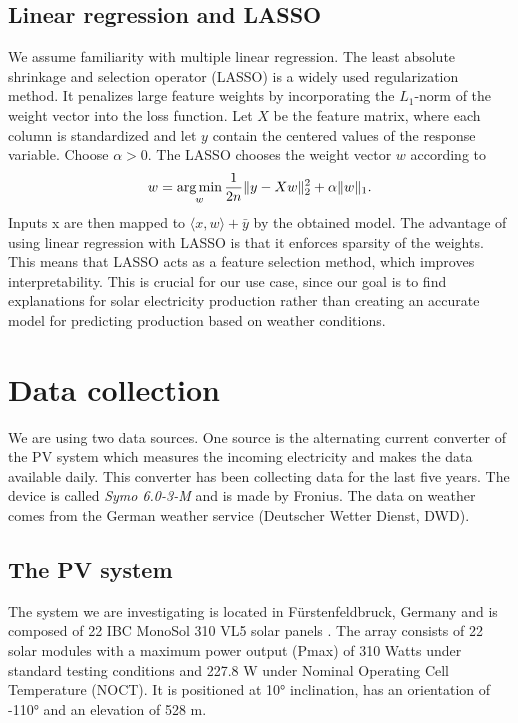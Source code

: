 \documentclass{article}
\begin{document}
\subsection{Linear regression and LASSO}
We assume familiarity with multiple linear regression. The least absolute shrinkage and selection operator (LASSO) is a widely used regularization method. It penalizes large feature weights by incorporating the $L_1$-norm of the weight vector into the loss function. Let $X$ be the feature matrix, where each column is standardized and let $y$ contain the centered values of the response variable. Choose $\alpha > 0$. The LASSO chooses the weight vector $w$ according to
\begin{equation*}
	w = \underset{w}{\text{arg\,min}} \, \frac{1}{2n} \|y - Xw\|_2^2 + \alpha \|w\|_1.
\end{equation*}
Inputs x are then mapped to $\langle x, w \rangle + \bar{y}$ by the obtained model. The advantage of using linear regression with LASSO is that it enforces sparsity of the weights. This means that LASSO acts as a feature selection method, which improves interpretability. This is crucial for our use case, since our goal is to find explanations for solar electricity production rather than creating an accurate model for predicting production based on weather conditions.


\section{Data collection}
We are using two data sources. One source is the alternating current converter of the PV system which measures the incoming electricity and makes the data available daily.
This converter has been collecting data for the last five years. The device is called \textit{Symo 6.0-3-M} and is made by Fronius.
The data on weather comes from the German weather service (Deutscher Wetter Dienst, DWD).
\subsection{The PV system}
The system we are investigating is located in Fürstenfeldbruck, Germany and is composed of 22 IBC MonoSol 310 VL5 solar panels \cite{MonoSol}.
The array consists of 22 solar modules with a maximum power output (Pmax) of 310 Watts under standard testing conditions and 227.8 W  under Nominal Operating Cell Temperature (NOCT).
It is positioned at 10° inclination, has an orientation of -110° and an elevation of 528 m.
\end{document}
